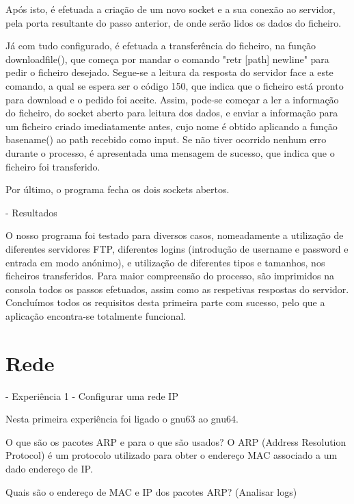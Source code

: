 \documentclass[article, a4paper, 11pt, oneside]{memoir}
\begin{document}
Após isto, é efetuada a criação de um novo socket e a sua conexão ao servidor, pela porta resultante do passo anterior, de onde serão lidos os dados do ficheiro.

Já com tudo configurado, é efetuada a transferência do ficheiro, na função download\textunderscore file(), que começa por mandar
o comando "retr [path] newline" para pedir o ficheiro desejado. Segue-se a leitura da resposta do servidor face a este comando,
a qual se espera ser o código 150, que indica que o ficheiro está pronto para download e o pedido foi aceite. 
Assim, pode-se começar a ler a informação do ficheiro, do socket aberto para leitura dos dados, e enviar a informação para um ficheiro criado imediatamente antes,
cujo nome é obtido aplicando a função basename() ao path recebido como input. Se não tiver ocorrido nenhum erro durante o processo, é apresentada uma mensagem de sucesso,
que indica que o ficheiro foi transferido. 

Por último, o programa fecha os dois sockets abertos.

- Resultados

O nosso programa foi testado para diversos casos, nomeadamente a utilização de diferentes servidores FTP,
diferentes logins (introdução de username e password e entrada em modo anónimo), e utilização de diferentes tipos e tamanhos, nos ficheiros transferidos.
Para maior compreensão do processo, são imprimidos na consola todos os passos efetuados, assim como as respetivas respostas do servidor.
Concluímos todos os requisitos desta primeira parte com sucesso, pelo que a aplicação encontra-se totalmente funcional.

\chapter[Rede][Rede]{Rede} \label{\thechapter}

- Experiência 1 - Configurar uma rede IP

Nesta primeira experiência foi ligado o gnu63 ao gnu64.

O que são os pacotes ARP e para o que são usados?
  O ARP (Address Resolution Protocol) é um protocolo utilizado para obter o endereço MAC associado
  a um dado endereço de IP.

Quais são o endereço de MAC e IP dos pacotes ARP?
(Analisar logs)
\end{document}
